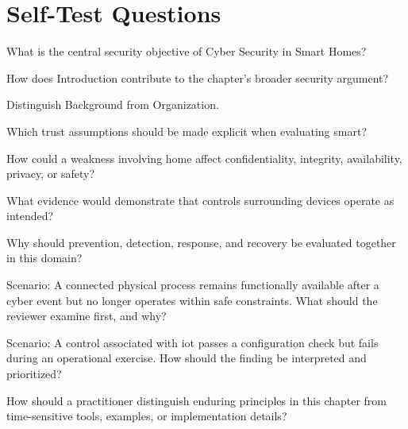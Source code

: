 \documentclass[11pt,letterpaper]{article}
\begin{document}
\section*{Self-Test Questions}
\begin{CornellRecallList}
\item What is the central security objective of Cyber Security in Smart Homes?
\item How does Introduction contribute to the chapter's broader security argument?
\item Distinguish Background from Organization.
\item Which trust assumptions should be made explicit when evaluating smart?
\item How could a weakness involving home affect confidentiality, integrity, availability, privacy, or safety?
\item What evidence would demonstrate that controls surrounding devices operate as intended?
\item Why should prevention, detection, response, and recovery be evaluated together in this domain?
\item Scenario: A connected physical process remains functionally available after a cyber event but no longer operates within safe constraints. What should the reviewer examine first, and why?
\item Scenario: A control associated with iot passes a configuration check but fails during an operational exercise. How should the finding be interpreted and prioritized?
\item How should a practitioner distinguish enduring principles in this chapter from time-sensitive tools, examples, or implementation details?
\end{CornellRecallList}
\end{document}
